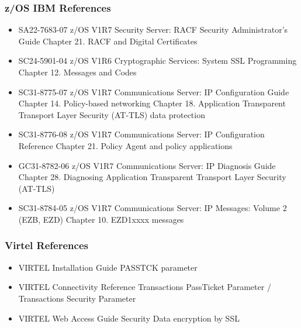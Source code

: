 \documentclass[letterpaper,10pt,english]{sphinxmanual}
\begin{document}
\subsubsection{z/OS IBM References}
\label{\detokenize{Customization:z-os-ibm-references}}\begin{itemize}
\item {} 
SA22-7683-07 z/OS V1R7 Security Server: RACF Security Administrator’s Guide Chapter 21. RACF and Digital Certificates

\item {} 
SC24-5901-04 z/OS V1R6 Cryptographic Services: System SSL Programming Chapter 12. Messages and Codes

\item {} 
SC31-8775-07 z/OS V1R7 Communications Server: IP Configuration Guide Chapter 14. Policy-based networking Chapter 18. Application Transparent Transport Layer Security (AT-TLS) data protection

\item {} 
SC31-8776-08 z/OS V1R7 Communications Server: IP Configuration Reference Chapter 21. Policy Agent and policy applications

\item {} 
GC31-8782-06 z/OS V1R7 Communications Server: IP Diagnosis Guide Chapter 28. Diagnosing Application Transparent Transport Layer Security (AT-TLS)

\item {} 
SC31-8784-05 z/OS V1R7 Communications Server: IP Messages: Volume 2 (EZB, EZD) Chapter 10. EZD1xxxx messages

\end{itemize}


\subsubsection{Virtel References}
\label{\detokenize{Customization:virtel-references}}\begin{itemize}
\item {} 
VIRTEL Installation Guide PASSTCK parameter

\item {} 
VIRTEL Connectivity Reference Transactions \textendash{} PassTicket Parameter / Transactions \textendash{} Security Parameter

\item {} 
VIRTEL Web Access Guide Security \textendash{} Data encryption by SSL

\end{itemize}
\end{document}
